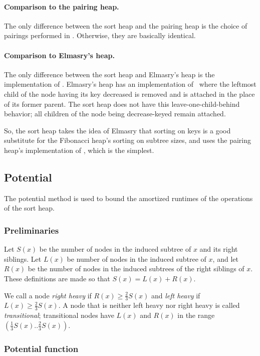 \begin{fullonly}
\paragraph{Comparison to the pairing heap.} 
The only difference between the sort heap and the pairing heap is the choice of pairings performed in \opEm. Otherwise, they are basically identical.

\paragraph{Comparison to Elmasry's heap.} 
The only difference between the sort heap and Elmasry's heap is the implementation of \opDc. Elmasry's heap has an implementation of \opDc\ where the leftmost child of the node having its key decreased is removed and is attached in the place of its former parent. The sort heap does not have this leave-one-child-behind behavior; all children of the node being decrease-keyed remain attached.

So, the sort heap takes the idea of Elmasry that sorting on keys is a good substitute for the Fibonacci heap's sorting on subtree sizes, and uses the pairing heap's implementation of \opDc, which is the simplest.


\subsection{Potential}

The potential method is used to bound the amortized runtimes of the operations of the sort heap.

\subsubsection{Preliminaries \checked}

Let $S(x)$ be the number of nodes in the induced subtree of $x$ and its right siblings. Let $L(x)$ be number of nodes in the induced subtree of $x$, and let $R(x)$ be the number of nodes in the induced subtrees of the right siblings of $x$. These definitions are made so that $S(x)=L(x)+R(x)$. 

We call a node \emph{right heavy} if $R(x) \geq \frac{2}{3}S(x)$ and \emph{left heavy} if $L(x) \geq \frac{2}{3}S(x)$. A node that is neither left heavy nor right heavy is called \emph{transitional}; transitional nodes have $L(x)$ and $R(x)$ in the range $(\frac{1}{3}S(x)..\frac{2}{3}S(x))$.

\subsubsection{Potential function \checked}


\end{fullonly}
